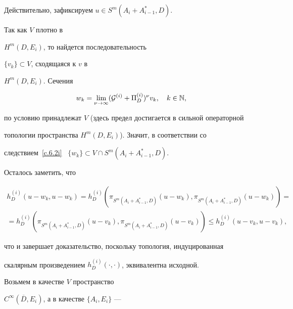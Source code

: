 \begin{pf}


Действительно, зафиксируем $u \in S^m (A_i+ A^*_{i-1},D)$.


Так как $V$ плотно в


$H^m (D, E_i)$, то найдется последовательность


$\{ v_k\} \subset V$, сходящаяся к $v$ в


$H^m (D, E_i)$. Сечения


$$


w_k=\lim_{\nu \to \infty} ({\cal G}^{(i)}+\Pi ^{(i)}_D)^\nu v_k ,


\quad k \in {\Bbb N},


$$


по условию принадлежат $V$ (здесь предел достигается в сильной операторной


топологии пространства $H^m (D, E_i)$). Значит, в соответствии со


следствием~\ref{c.6.2i} \ $\{ w_k \} \subset V \cap S^m (


A_i+ A^*_{i-1},D)$.





Осталось заметить, что


\begin{multline*}


h^{(i)}_D (u - w_k, u- w_k) =h^{(i)}_D (


\pi_{S^m (A_i+A^*_{i-1}, D) } (u - w_k),


\pi_{S^m (A_i+ A^*_{i-1}, D) } (u - w_k))=\\


%


=h_D^{(i)} (\pi_{S^m (A_i+ A^*_{i-1}, D) } (u - v_k)


, \pi_{S ^m(A_i+ A^*_{i-1}, D)} (u - v_k)) \leq


h^{(i)}_D (u - v_k, u- v_k),


\end{multline*}


что и завершает доказательство, поскольку топология, индуцированная


скалярным произведением $h^{(i)}_D (\cdot,\cdot)$, эквивалентна исходной.


\end{pf}





Возьмем в качестве $V$ пространство


$C^\infty (\overline D, E_i)$, а в качестве $\{ A_i, E_i\}$ ---


